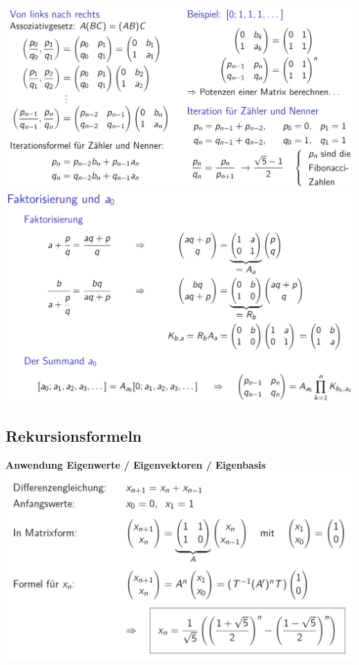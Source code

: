 		 \includegraphics[width=0.8\linewidth]{Bilder/kettenbruch4} \\
		 
		 \includegraphics[width=0.8\linewidth]{Bilder/kettenbruch5} \\
		  
		 
		 
		 
		 \subsection{Rekursionsformeln}
		 \textbf{Anwendung Eigenwerte / Eigenvektoren / Eigenbasis} \\
		 \includegraphics[width=0.8\linewidth]{Bilder/rekursion1} \\ 
		 
		 
		 
